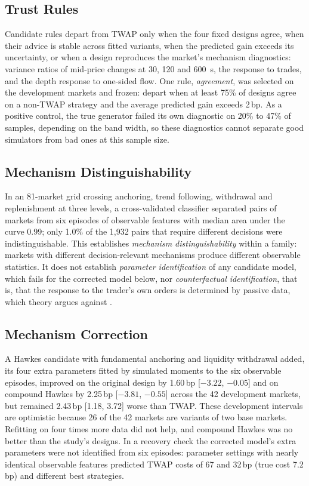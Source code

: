 \documentclass{ieeeaccess}
\newcommand{\bp}{\,bp}
\begin{document}
\subsection{Trust Rules}
Candidate rules depart from TWAP only when the four fixed designs agree, when their advice is stable across fitted
variants, when the predicted gain exceeds its uncertainty, or when a design reproduces the market's mechanism
diagnostics: variance ratios of mid-price changes at 30, 120 and 600~s, the response to trades, and the depth response to
one-sided flow. One rule, \emph{agreement}, was selected on the development markets and frozen: depart when at least 75\%
of designs agree on a non-TWAP strategy and the average predicted gain exceeds 2\bp. As a positive control, the true
generator failed its own diagnostic on 20\% to 47\% of samples, depending on the band width, so these diagnostics cannot
separate good simulators from bad ones at this sample size.

\subsection{Mechanism Distinguishability}
In an 81-market grid crossing anchoring, trend following, withdrawal and replenishment at three levels, a cross-validated
classifier separated pairs of markets from six episodes of observable features with median area under the curve 0.99;
only 1.0\% of the 1,932 pairs that require different decisions were indistinguishable. This establishes \emph{mechanism
distinguishability} within a family: markets with different decision-relevant mechanisms produce different observable
statistics. It does not establish \emph{parameter identification} of any candidate model, which fails for the corrected
model below, nor \emph{counterfactual identification}, that is, that the response to the trader's own orders is
determined by passive data, which theory argues against \cite{naviglio2026metaorder,fujiwara2026decay}.

\subsection{Mechanism Correction}
A Hawkes candidate with fundamental anchoring and liquidity withdrawal added, its four extra parameters fitted by
simulated moments to the six observable episodes, improved on the original design by 1.60\bp{} [$-3.22$, $-0.05$] and on
compound Hawkes by 2.25\bp{} [$-3.81$, $-0.55$] across the 42 development markets, but remained 2.43\bp{} [1.18, 3.72]
worse than TWAP. These development intervals are optimistic because 26 of the 42 markets are variants of two base
markets. Refitting on four times more data did not help, and compound Hawkes was no better than the study's designs. In
a recovery check the corrected model's extra parameters were not identified from six episodes: parameter settings with
nearly identical observable features predicted TWAP costs of 67 and 32\bp{} (true cost 7.2\bp) and different best
strategies.
\end{document}
